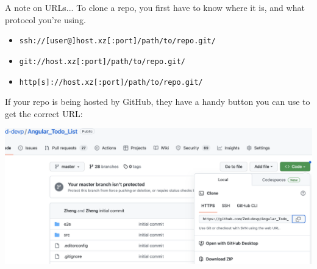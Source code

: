 \documentclass[11pt]{beamer}
\begin{document}
\begin{frame}{A note on URLs...}
\small
To clone a repo, you first have to know where it is, and what protocol you're using.
\begin{itemize}
\item \texttt{ssh://[user@]host.xz[:port]/path/to/repo.git/}
\item \texttt{git://host.xz[:port]/path/to/repo.git/}
\item \texttt{http[s]://host.xz[:port]/path/to/repo.git/}
\end{itemize}
If your repo is being hosted by GitHub, they have a handy button you can use to get the correct URL:

\includegraphics[scale=0.2]{github.png}
\end{frame}
\end{document}
